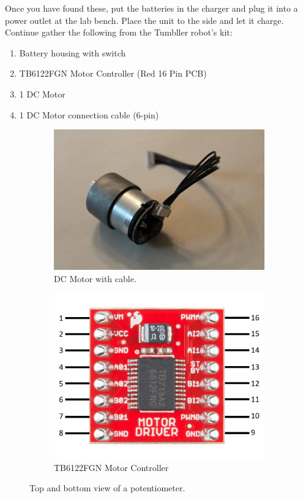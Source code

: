 \documentclass[12pt]{article}
\begin{document}
Once you have found these, put the batteries in the charger and plug it into a power outlet at the lab bench. Place the unit to the side and let it charge. Continue gather the following from the Tumbller robot's kit:

\begin{enumerate}
    \item Battery housing with switch
    \item TB6122FGN Motor Controller (Red 16 Pin PCB)
    \item 1 DC Motor
    \item 1 DC Motor connection cable (6-pin)
\end{enumerate}

\begin{figure}[H]
\begin{subfigure}{.5\textwidth}
    \centering
    \includegraphics[width=0.8\linewidth]{photos/lab/motor.jpg}
    \caption{DC Motor with cable.}
\end{subfigure}%
\begin{subfigure}{.5\textwidth}
  \centering
  \includegraphics[width=0.79\linewidth]{photos/lab/motordriver.png}
  \caption{TB6122FGN Motor Controller}
\end{subfigure}
\caption{Top and bottom view of a potentiometer.}
\end{figure}
\end{document}
